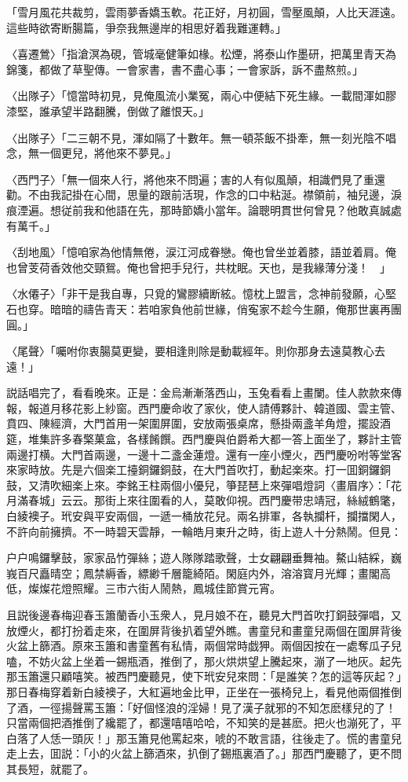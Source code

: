 「雪月風花共裁剪，雲雨夢香嬌玉軟。花正好，月初圓，雪壓風顛，人比天涯遠。這些時欲寄断腸篇，爭奈我無邊岸的相思好着我難運轉。」

〈喜遷鶯〉「指滄溟為硯，管城毫健筆如椽。松煙，將泰山作墨研，把萬里青天為錦箋，都做了草聖傳。一會家書，書不盡心事；一會家訴，訴不盡熬煎。」

〈出隊子〉「憶當時初見，見俺風流小業冤，兩心中便結下死生緣。一載間渾如膠漆堅，誰承望半路翻騰，倒做了離恨天。」

〈出隊子〉「二三朝不見，渾如隔了十數年。無一頓茶飯不掛牽，無一刻光陰不唱念，無一個更兒，將他來不夢見。」

〈西門子〉「無一個來人行，將他來不問遍；害的人有似風顛，相識們見了重還勸。不由我記掛在心間，思量的跟前活現，作念的口中粘涎。襟領前，袖兒邊，淚痕湮遍。想従前我和他語在先，那時節嬌小當年。論聰明貫世何曾見？他敢真誠處有萬千。」

〈刮地風〉「憶咱家為他情無倦，涙江河成眷戀。俺也曾坐並着膝，語並着肩。俺也曾芰荷香效他交頸鴛。俺也曾把手兒行，共枕眠。天也，是我緣薄分淺！　」

〈水僊子〉「非干是我自專，只覓的鸞膠續断絃。憶枕上盟言，念神前發願，心堅石也穿。暗暗的禱告青天：若咱家負他前世緣，俏寃家不趁今生願，俺那世裏再團圓。」

〈尾聲〉「囑咐你衷腸莫更變，要相逢則除是動載經年。則你那身去遠莫教心去遠！」

説話唱完了，看看晚來。正是：金烏漸漸落西山，玉兔看看上畫闌。佳人款款來傳報，報道月移花影上紗窗。西門慶命收了家伙，使人請傅夥計、韓道國、雲主管、賁四、陳經濟，大門首用一架圍屏圍，安放兩張桌席，懸掛兩盞羊角燈，擺設酒筵，堆集許多春檠菓盒，各樣餚饌。西門慶與伯爵希大都一答上面坐了，夥計主管兩邊打横。大門首兩邊，一邊十二盞金蓮燈。還有一座小煙火，西門慶吩咐等堂客來家時放。先是六個楽工擡銅鑼銅鼓，在大門首吹打，動起楽來。打一囬銅鑼銅鼓，又清吹細楽上來。李銘王柱兩個小優兒，箏琵琶上來彈唱燈詞〈畫眉序〉：「花月滿春城」云云。那街上來往圍看的人，莫敢仰視。西門慶带忠靖冠，絲絨鶴氅，白綾襖子。玳安與平安兩個，一遞一桶放花兒。兩名排軍，各執攔杆，攔擋閑人，不許向前擁擠。不一時碧天雲靜，一輪皓月東升之時，街上遊人十分熱鬧。但見：

户户鳴鑼擊鼓，家家品竹彈絲；遊人隊隊踏歌聲，士女翩翩垂舞袖。鰲山結綵，巍峩百尺矗晴空；鳳禁縟香，縹緲千層籠綺陌。閑庭内外，溶溶寳月光輝；畫閣高低，燦燦花燈照耀。三市六街人鬧熱，鳳城佳節賞元宵。

且説後邊春梅迎春玉簫蘭香小玉衆人，見月娘不在，聽見大門首吹打銅鼓彈唱，又放煙火，都打扮着走來，在圍屏背後扒着望外瞧。書童兒和畫童兒兩個在圍屏背後火盆上篩酒。原來玉簫和書童舊有私情，兩個常時戯狎。兩個因按在一處奪瓜子兒嗑，不妨火盆上坐着一錫瓶酒，推倒了，那火烘烘望上騰起來，漰了一地灰。起先那玉簫還只顧嘻笑。被西門慶聽見，使下玳安兒來問：「是誰笑？怎的這等灰起？」那日春梅穿着新白綾襖子，大紅遍地金比甲，正坐在一張椅兒上，看見他兩個推倒了酒，一徑揚聲罵玉簫：「好個怪浪的淫婦！見了漢子就邪的不知怎麽樣兒的了！只當兩個把酒推倒了纔罷了，都還嘻嘻哈哈，不知笑的是甚麽。把火也漰死了，平白落了人恁一頭灰！」那玉簫見他罵起來，唬的不敢言語，往後走了。慌的書童兒走上去，囬説：「小的火盆上篩酒來，扒倒了錫瓶裏酒了。」那西門慶聽了，更不問其長短，就罷了。

